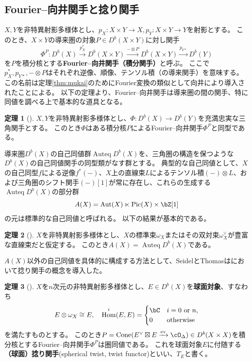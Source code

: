 \documentclass[uplatex,11pt,a4paper,dvipdfmx]{jsarticle}
\numberwithin{equation}{section}
\numberwithin{figure}{section}
\theoremstyle{definition}
\newtheorem{theorem}{定理}[section]
\DeclareMathOperator{\Hom}{\mathrm{Hom}}
\DeclareMathOperator{\Auteq}{\mathrm{Auteq}}
\DeclareMathOperator{\Cone}{\mathrm{Cone}}
\DeclareMathOperator{\ev}{\mathrm{ev}}
\DeclareMathOperator{\Pic}{\mathrm{Pic}}
\DeclareMathOperator{\Aut}{\mathrm{Aut}}
\begin{document}
\subsection{Fourier--向井関手と捻り関手}
$X, Y$を非特異射影多様体とし、$p_X \colon X\times Y \to X, p_Y \colon X \times Y \to Y$を射影とする。
このとき、$X \times Y$の導来圏の対象$P \in D^b(X \times Y)$に対し関手
\begin{equation}
    \Phi^P \colon D^b(X) \xrightarrow{p_X^*} D^b(X \times Y) \xrightarrow{ - \otimes P} D^b(X \times Y) \xrightarrow{p_{Y*}} D^b(Y)
\end{equation}
を$P$を積分核とする\textbf{Fourier--向井関手（積分関手）}と呼ぶ。
ここで$p_X^*, p_{Y*}, - \otimes P$はそれぞれ逆像、順像、テンソル積（の導来関手）を意味する。
この名前は定理\ref{thm:mukai}のためにFourier変換の類似として向井により導入されたことによる。
以下の定理より、Fourier--向井関手は導来圏の間の関手、特に同値を調べる上で基本的な道具となる。
\begin{theorem}[\cite{MR1465519}]
    $X, Y$を非特異射影多様体とし、$\Phi \colon D^b(X) \to D^b(Y)$を充満忠実な三角関手とする。
    このとき$\Phi$はある積分核$P$によるFourier--向井関手$\Phi^P$と同型である。
\end{theorem}
導来圏$D^b(X)$の自己同値群$\Auteq D^b(X)$を、三角圏の構造を保つような$D^b(X)$の自己同値関手の同型類がなす群とする。
典型的な自己同値として、$X$の自己同型$f$による逆像$f^*(-)$、$X$上の直線束$L$によるテンソル積$(-)\otimes L$、および三角圏のシフト関手$(-)[1]$が常に存在し、これらの生成する$\Auteq D^b(X)$の部分群
\begin{equation}
    A(X) = \Aut(X) \ltimes \Pic(X) \times \bZ[1]
\end{equation}
の元は標準的な自己同値と呼ばれる。
以下の結果が基本的である。
\begin{theorem}[\cite{MR1818984}]\label{BO}
    $X$を非特異射影多様体とし、$X$の標準束$\omega_X$またはその双対束$\omega_X^\vee$が豊富な直線束だと仮定する。
    このとき$A(X) = \Auteq D^b(X)$である。
\end{theorem}
$A(X)$以外の自己同値を具体的に構成する方法として、SeidelとThomasは\cite{MR1831820}において捻り関手の概念を導入した。
\begin{theorem}[\cite{MR1831820}]
    $X$を$n$次元の非特異射影多様体とし、$E \in D^b(X)$を\textbf{球面対象}、すなわち\begin{equation}
        E \otimes \omega_X \cong E,\quad \Hom^i(E, E) = \begin{cases}
            \bC & i = \text{$0$ or $n$}, \\
            0   & \text{otherwise}
        \end{cases}
    \end{equation}を満たすものとする。
    このとき$P = \Cone(E^\vee \boxtimes E \xrightarrow{\ev} \cO_\Delta) \in D^b(X \times X)$を積分核とするFourier--向井関手$\Phi^P$は圏同値である。
    これを球面対象$E$に付随する\textbf{（球面）捻り関手}(spherical twist, twist functor)といい、$T_E$と書く。
\end{theorem}
\end{document}

